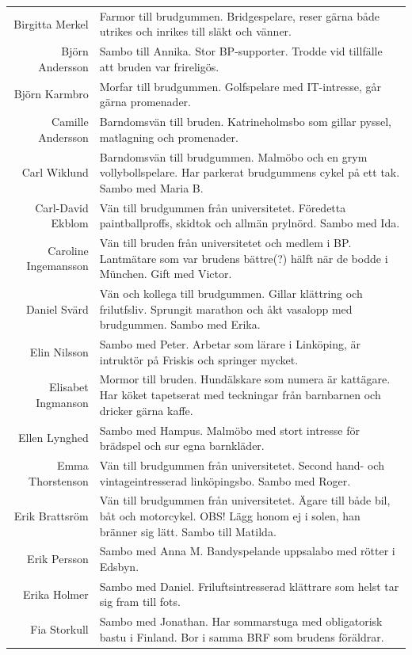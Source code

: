 \documentclass[a5paper]{article}
\begin{document}
\begin{longtable}[l]{N|L}
				Birgitta Merkel	&	Farmor till brudgummen. Bridgespelare, reser gärna både utrikes och inrikes till släkt och vänner. 	\\
				Björn Andersson	&	Sambo till Annika. Stor BP-supporter. Trodde vid tillfälle att bruden var frireligös.	\\
				Björn Karmbro	&	Morfar till brudgummen. Golfspelare med IT-intresse, går gärna promenader.  	\\
				Camille Andersson	&	Barndomsvän till bruden. Katrineholmsbo som gillar pyssel, matlagning och promenader.	\\
				Carl Wiklund	&	Barndomsvän till brudgummen. Malmöbo och en grym vollybollspelare. Har parkerat brudgummens cykel på ett tak. Sambo med Maria B.	\\
				Carl-David Ekblom	&	Vän till brudgummen från universitetet. Föredetta paintballproffs, skidtok och allmän prylnörd. Sambo med Ida.	\\
				Caroline Ingemansson &	Vän till bruden från universitetet och medlem i BP. Lantmätare som var brudens bättre(?) hälft när de bodde i München. Gift med Victor.	\\
				Daniel Svärd	&	Vän och kollega till brudgummen. Gillar klättring och frilutfsliv. Sprungit marathon och åkt vasalopp med brudgummen.  Sambo med Erika.	\\
				Elin Nilsson	&	Sambo med Peter. Arbetar som lärare i Linköping, är intruktör på Friskis och springer mycket.	\\
				Elisabet Ingmanson	&	Mormor till bruden. Hundälskare som numera är kattägare. Har köket tapetserat med teckningar från barnbarnen och dricker gärna kaffe.	\\
				Ellen Lynghed	&	Sambo med Hampus. Malmöbo med stort intresse för brädspel och sur egna barnkläder.	\\
				Emma Thorstenson	&	Vän till brudgummen från universitetet. Second hand- och vintageintresserad linköpingsbo. Sambo med Roger.	\\
				Erik Brattsröm	&	Vän till brudgummen från universitetet. Ägare till både bil, båt och motorcykel. OBS! Lägg honom ej i solen, han bränner sig lätt. Sambo till Matilda.	\\
				Erik Persson	&	Sambo med Anna M. Bandyspelande uppsalabo med rötter i Edsbyn. 	\\
				Erika Holmer	&	Sambo med Daniel. Friluftsintresserad klättrare som helst tar sig fram till fots.	\\
				Fia Storkull	&	Sambo med Jonathan.  Har sommarstuga med obligatorisk bastu i Finland. Bor i samma BRF som brudens föräldrar.	\\

\end{longtable}
\end{document}
